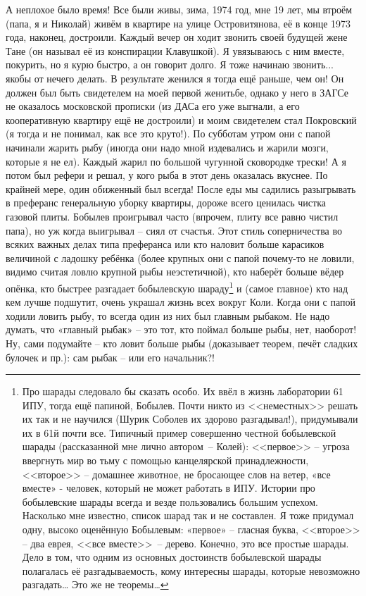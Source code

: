  А неплохое было время! Все были живы, зима, 1974 год, мне 19 лет, мы втроём (папа, я и Николай) живём в квартире на улице Островитянова, её в конце 1973 года, наконец, достроили. Каждый вечер он ходит звонить своей будущей жене Тане (он называл её из конспирации Клавушкой). Я увязываюсь с ним вместе, покурить, но я курю быстро, а он говорит долго. Я тоже начинаю звонить... якобы от нечего делать. В результате женился я тогда ещё раньше, чем он! Он должен был быть свидетелем на моей первой женитьбе, однако у него в ЗАГСе не оказалось московской прописки (из ДАСа его уже выгнали, а его кооперативную квартиру ещё не достроили) и моим свидетелем стал Покровский (я тогда и не понимал, как все это круто!). По субботам утром они с папой начинали жарить рыбу (иногда они надо мной издевались и жарили мозги, которые я не ел). Каждый жарил по большой чугунной сковородке трески! А я потом был рефери и решал, у кого рыба в этот день оказалась вкуснее. По крайней мере, один обиженный был всегда! После еды мы садились разыгрывать в преферанс генеральную уборку квартиры, дороже всего ценилась чистка газовой плиты. Бобылев проигрывал часто (впрочем, плиту все равно чистил папа), но уж когда выигрывал – сиял от счастья. Этот стиль соперничества во всяких важных делах типа преферанса или кто наловит больше карасиков величиной с ладошку ребёнка (более крупных они с папой почему-то не ловили, видимо считая ловлю крупной рыбы неэстетичной), кто наберёт больше вёдер опёнка, кто быстрее разгадает бобылевскую шараду\footnote{Про шарады следовало бы сказать особо. Их ввёл в жизнь лаборатории 61 ИПУ, тогда ещё папиной, Бобылев. Почти никто из <<неместных>> решать их так и не научился (Шурик Соболев их здорово разгадывал!), придумывали их в 61й почти все. Типичный пример совершенно честной бобылевской шарады (рассказанной мне лично автором~– Колей): <<первое>> – угроза ввергнуть мир во тьму с помощью канцелярской принадлежности, <<второе>> – домашнее животное, не бросающее слов на ветер, «все вместе» - человек, который не может работать в ИПУ. Истории про бобылевские шарады всегда и везде пользовались большим успехом. Насколько мне известно, список шарад так и не составлен. Я тоже придумал одну, высоко оценённую Бобылевым: «первое» – гласная буква, <<второе>> – два еврея, <<все вместе>>~– дерево. Конечно, это все простые шарады. Дело в том, что одним из основных достоинств бобылевской шарады полагалась её разгадываемость, кому интересны шарады, которые невозможно разгадать… Это же не теоремы\ldots} и (самое главное) кто над кем лучше подшутит, очень украшал жизнь всех вокруг Коли. Когда они с папой ходили ловить рыбу, то всегда один из них был главным рыбаком. Не надо думать, что «главный рыбак» – это тот, кто поймал больше рыбы, нет, наоборот! Ну, сами подумайте – кто ловит больше рыбы (доказывает теорем, печёт сладких булочек и пр.): сам рыбак – или его начальник?!

